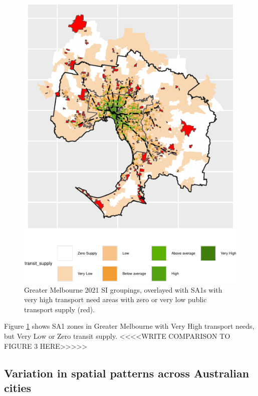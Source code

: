 \documentclass[preprint, 3p,
authoryear]{elsarticle} %
\begin{document}
\begin{figure}
\includegraphics[width=1\linewidth]{Leveraging_GTFS_to_assess_transit_supply_Transport_Geography_files/figure-latex/Greater_Melbourne_2021_needs_gap_map-1} \caption{Greater Melbourne 2021 SI groupings, overlayed with SA1s with very high transport need areas with zero or very low public transport supply (red).}\label{fig:Greater_Melbourne_2021_needs_gap_map}
\end{figure}

Figure \ref{fig:Greater_Melbourne_2021_needs_gap_map} shows SA1 zones in
Greater Melbourne with Very High transport needs, but Very Low or Zero
transit supply. \textless\textless\textless\textless WRITE COMPARISON TO
FIGURE 3
HERE\textgreater\textgreater\textgreater\textgreater\textgreater{}

\subsection{Variation in spatial patterns across Australian
cities}\label{variation-in-spatial-patterns-across-australian-cities}
\end{document}
